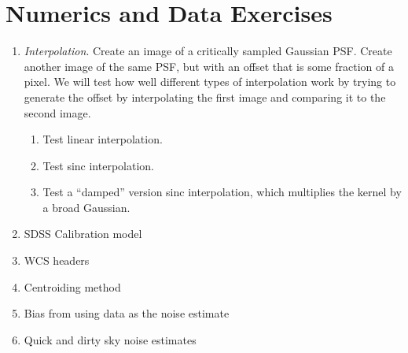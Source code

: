\section{Numerics and Data Exercises}

\begin{enumerate}
\item {\it Interpolation}. Create an image of a critically sampled
    Gaussian PSF. Create another image of the same PSF, but with an
    offset that is some fraction of a pixel. We will test how well
    different types of interpolation work by trying to generate the
    offset by interpolating the first image and comparing it to the
    second image.
    \begin{enumerate}
     \item Test linear interpolation. 
     \item Test sinc interpolation.
     \item Test a ``damped'' version sinc interpolation, which
    multiplies the kernel by a broad Gaussian.
    \end{enumerate}
\item SDSS Calibration model
\item WCS headers
\item Centroiding method
\item Bias from using data as the noise estimate
\item Quick and dirty sky noise estimates
\end{enumerate}


  
